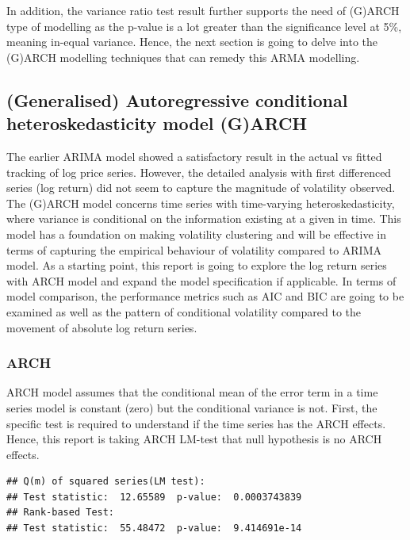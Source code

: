 \documentclass[
  11pt,
]{article}
\begin{document}
In addition, the variance ratio test result further supports the need of
(G)ARCH type of modelling as the p-value is a lot greater than the
significance level at 5\%, meaning in-equal variance. Hence, the next
section is going to delve into the (G)ARCH modelling techniques that can
remedy this ARMA modelling.

\hypertarget{generalised-autoregressive-conditional-heteroskedasticity-model-garch}{%
\subsection{(Generalised) Autoregressive conditional heteroskedasticity
model
(G)ARCH}\label{generalised-autoregressive-conditional-heteroskedasticity-model-garch}}

The earlier ARIMA model showed a satisfactory result in the actual vs
fitted tracking of log price series. However, the detailed analysis with
first differenced series (log return) did not seem to capture the
magnitude of volatility observed. The (G)ARCH model concerns time series
with time-varying heteroskedasticity, where variance is conditional on
the information existing at a given in time. This model has a foundation
on making volatility clustering and will be effective in terms of
capturing the empirical behaviour of volatility compared to ARIMA model.
As a starting point, this report is going to explore the log return
series with ARCH model and expand the model specification if applicable.
In terms of model comparison, the performance metrics such as AIC and
BIC are going to be examined as well as the pattern of conditional
volatility compared to the movement of absolute log return series.

\hypertarget{arch}{%
\subsubsection{ARCH}\label{arch}}

ARCH model assumes that the conditional mean of the error term in a time
series model is constant (zero) but the conditional variance is not.
First, the specific test is required to understand if the time series
has the ARCH effects. Hence, this report is taking ARCH LM-test that
null hypothesis is no ARCH effects.

\begin{verbatim}
## Q(m) of squared series(LM test):  
## Test statistic:  12.65589  p-value:  0.0003743839 
## Rank-based Test:  
## Test statistic:  55.48472  p-value:  9.414691e-14
\end{verbatim}
\end{document}

